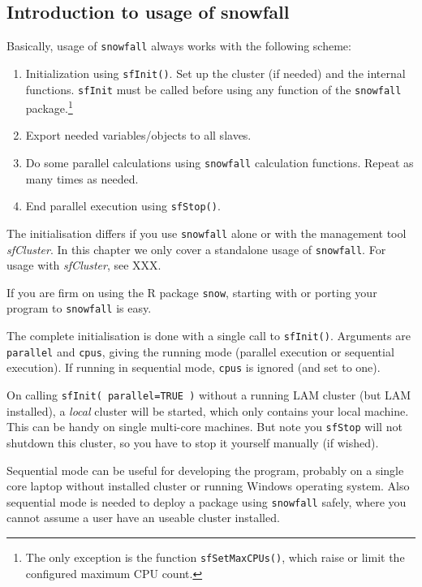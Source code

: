 \documentclass[10pt,oneside]{article}
\begin{document}
\subsection{Introduction to usage of snowfall}
Basically, usage of \texttt{snowfall} always works with the
following scheme:
\begin{enumerate}
\item
Initialization using \texttt{sfInit()}. Set up the cluster (if needed)
and the internal functions. \texttt{sfInit} must be called before
using any function of the \texttt{snowfall} package.\footnote{The only
exception is the function \texttt{sfSetMaxCPUs()}, which raise or limit
the configured maximum CPU count.}
\item Export needed variables/objects to all slaves.
\item
Do some parallel calculations using \texttt{snowfall} calculation
functions. Repeat as many times as needed.
\item
End parallel execution using \texttt{sfStop()}.
\end{enumerate}

The initialisation differs if you use \texttt{snowfall} alone or with
the management tool \emph{sfCluster}. In this chapter we only cover a
standalone usage of \texttt{snowfall}.
For usage with \emph{sfCluster}, see XXX.

If you are firm on using the R package \texttt{snow}, starting with
or porting your program to
\texttt{snowfall} is easy.

The complete initialisation is done with a single call to
\texttt{sfInit()}.
Arguments are \texttt{parallel} and \texttt{cpus}, giving the running
mode (parallel execution or sequential execution).
If running in sequential mode, \texttt{cpus} is ignored (and set
to one).

On calling \texttt{sfInit( parallel=TRUE )} without a running LAM
cluster (but LAM installed), a \emph{local} cluster will be started,
which only contains your local machine. This can be handy on single
multi-core machines. But note you \texttt{sfStop} will not shutdown
this cluster, so you have to stop it yourself manually (if wished).

Sequential mode can be useful for developing the program, probably
on a single core laptop without installed cluster or running Windows
operating system. Also sequential mode is needed to deploy a package
using \texttt{snowfall} safely,
where you cannot assume a user have an useable cluster installed.
\end{document}
